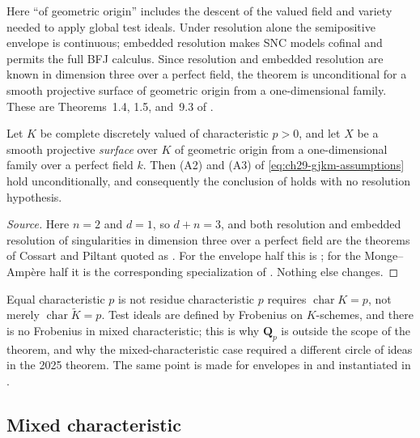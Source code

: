 Here ``of geometric origin'' includes the descent of the valued field and
variety needed to apply global test ideals.  Under resolution alone the
semipositive envelope is continuous; embedded resolution makes SNC models
cofinal and permits the full BFJ calculus.  Since resolution and embedded
resolution are known in dimension three over a perfect field, the theorem
is unconditional for a smooth projective surface of geometric origin from a
one-dimensional family.  These are Theorems~1.4, 1.5, and~9.3 of
\cite{GJKM19}.

\begin{corollary}
\label{cor:ch29-gjkm-surface-cy}
Let $K$ be complete discretely valued of characteristic $p>0$, and let
$X$ be a smooth projective \emph{surface} over $K$ of geometric origin
from a one-dimensional family over a perfect field $k$.  Then
\textup{(A2)} and \textup{(A3)} of \eqref{eq:ch29-gjkm-assumptions} hold
unconditionally, and consequently the conclusion of
 holds with no resolution
hypothesis.
\end{corollary}

\begin{proof}[Source]
Here $n=2$ and $d=1$, so $d+n=3$, and both resolution and embedded
resolution of singularities in dimension three over a perfect field are the
theorems of Cossart and Piltant quoted as \cite[Theorem~6.3]{GJKM19}.  For
the envelope half this is ; for the
Monge--Amp\`ere half it is the corresponding specialization of
\cite[Theorem~9.3]{GJKM19}.  Nothing else changes.
\end{proof}

\begin{warning}{Equal characteristic $p$ is not residue characteristic
$p$}
\label{warn:ch29-equal-vs-residue}
 requires
$\operatorname{char}K=p$, not merely $\operatorname{char}\widetilde K=p$.
Test ideals are defined by Frobenius on $K$-schemes, and there is no
Frobenius in mixed characteristic; this is why $\mathbf Q_p$ is outside
the scope of the theorem, and why the mixed-characteristic case
 required a different circle of
ideas in the 2025 theorem.  The same point is made for envelopes in
 and instantiated in
.
\end{warning}

\subsection{Mixed characteristic}
\label{sec:ch29-later-mixed}

